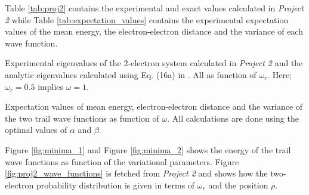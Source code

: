 \documentclass[12pt,english,a4paper]{article}
\begin{document}
Table \ref{tab:proj2} contains the experimental and exact values calculated in \textit{Project 2} while Table \ref{tab:expectation_values} contains the experimental expectation values of the mean energy, the electron-electron distance and the variance of each wave function. 

\begin{table}[htb]
    \centering
        \caption{Experimental eigenvalues of the 2-electron system calculated in \textit{Project 2} and the analytic eigenvalues calculated using Eq. (16a) in \cite{Taut}. All as function of $\omega_r$. Here; $\omega_r=0.5$ implies $\omega=1$.}
        \label{tab:proj2}
\end{table}

\begin{table}[htb]
    \centering
        \caption{Expectation values of mean energy, electron-electron distance and the variance of the two trail wave functions as function of $\omega$. All calculations are done using the optimal values of $\alpha$ and $\beta$.}
        \label{tab:expectation_values}
\end{table}

Figure \ref{fig:minima_1} and Figure \ref{fig:minima_2} shows the energy of the trail wave functions as function of the variational parameters. Figure \ref{fig:proj2_wave_functions} is fetched from \textit{Project 2} and shows how the two-electron probability distribution is given in terms of $\omega_r$ and the position $\rho$.
\end{document}
